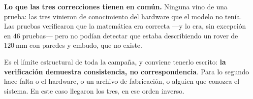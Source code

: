 \documentclass[11pt,a4paper]{article}
\begin{document}
\begin{tcolorbox}[colback=black!3,colframe=black!55,boxrule=0.6pt,arc=1pt]
\textbf{Lo que las tres correcciones tienen en común.} Ninguna vino de una prueba: las
tres vinieron de conocimiento del hardware que el modelo no tenía. Las pruebas
verificaron que la matemática era correcta ---y lo era, sin excepción en $46$ pruebas---
pero no podían detectar que estaba describiendo un rover de $120\ \mathrm{mm}$ con
paredes y embudo, que no existe.

Es el límite estructural de toda la campaña, y conviene tenerlo escrito:
\textbf{la verificación demuestra consistencia, no correspondencia}. Para lo segundo hace
falta o el hardware, o un archivo de fabricación, o alguien que conozca el sistema. En
este caso llegaron los tres, en ese orden inverso.
\end{tcolorbox}
\end{document}
